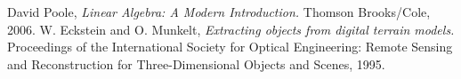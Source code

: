 \documentclass[a4paper,11pt,twoside]{article}
\theoremstyle{definition}
\theoremstyle{remark}
\newcommand{\sh}[1]{\colorbox{pink}{#1}}
\newcommand{\lnk}[1]{\sh{\hyperref[#1]{\ref*{#1}}}}
\begin{document}
%
\newpage
\begin{thebibliography}{99}
 David Poole, \emph{Linear Algebra: A Modern Introduction.} Thomson Brooks/Cole, 2006.
 W. Eckstein and O. Munkelt, \emph{Extracting objects from digital terrain
models.} Proceedings of the International Society for Optical Engineering: Remote Sensing
and Reconstruction for Three-Dimensional Objects and Scenes, 1995.
\end{thebibliography}
\end{document}
